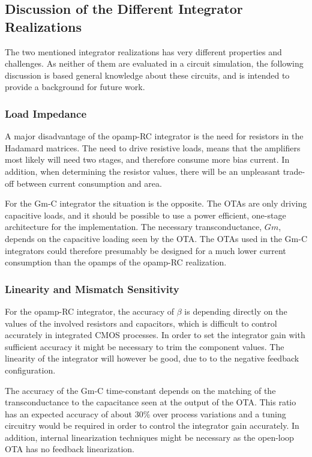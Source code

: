 \subsection{Discussion of the Different Integrator Realizations}
The two mentioned integrator realizations has very different properties and challenges. As neither of them are evaluated in a circuit simulation, the following discussion is based general knowledge about these circuits, and is intended to provide a background for future work.

\subsubsection*{Load Impedance}
A major disadvantage of the opamp-RC integrator is the need for resistors in the Hadamard matrices. The need to drive resistive loads, means that the amplifiers most likely will need two stages, and therefore consume more bias current. In addition, when determining the resistor values, there will be an unpleasant trade-off between current consumption and area.

For the Gm-C integrator the situation is the opposite. The OTAs are only driving capacitive loads, and it should be possible to use a power efficient, one-stage architecture for the implementation. The necessary transconductance, $Gm$, depends on the capacitive loading seen by the OTA. The OTAs used in the Gm-C integrators could therefore presumably be designed for a much lower current consumption than the opamps of the opamp-RC realization.

\subsubsection*{Linearity and Mismatch Sensitivity}
For the opamp-RC integrator, the accuracy of $\beta$ is depending directly on the values of the involved resistors and capacitors, which is difficult to control accurately in integrated CMOS processes. In order to set the integrator gain with sufficient accuracy it might be necessary to trim the component values. The linearity of the integrator will however be good, due to to the negative feedback configuration.

The accuracy of the Gm-C time-constant depends on the matching of the transconductance to the capacitance seen at the output of the OTA. This ratio has an expected accuracy of about 30\% over process variations \cite{johns_martin} and a tuning circuitry would be required in order to control the integrator gain accurately. In addition, internal linearization techniques might be necessary as the open-loop OTA has no feedback linearization.

